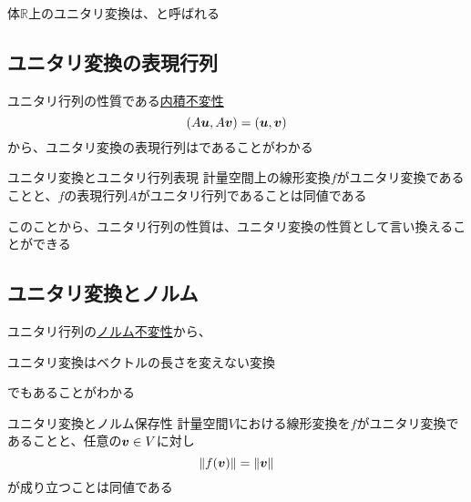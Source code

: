 \documentclass[../../../topic_linear-algebra]{subfiles}
\begin{document}
体$\mathbb{R}$上のユニタリ変換は、と呼ばれる

\subsection{ユニタリ変換の表現行列}

ユニタリ行列の性質である\hyperref[thm:unitary-characterized-by-inner-product-invariance]{内積不変性}
\begin{equation*}
  (A\vb*{u}, A\vb*{v}) = (\vb*{u}, \vb*{v})
\end{equation*}
から、ユニタリ変換の表現行列はであることがわかる

\begin{theorem}{ユニタリ変換とユニタリ行列表現}
  計量空間上の線形変換$f$がユニタリ変換であることと、$f$の表現行列$A$がユニタリ行列であることは同値である
\end{theorem}

このことから、ユニタリ行列の性質は、ユニタリ変換の性質として言い換えることができる

\subsection{ユニタリ変換とノルム}

ユニタリ行列の\hyperref[thm:unitary-characterized-by-norm-invariance]{ノルム不変性}から、
\begin{shaded}
  ユニタリ変換はベクトルの長さを変えない変換
\end{shaded}
でもあることがわかる

\begin{theorem}{ユニタリ変換とノルム保存性}
  計量空間$V$における線形変換を$f$がユニタリ変換であることと、任意の$\vb*{v} \in V$に対し
  \begin{equation*}
    \|f(\vb*{v})\| = \|\vb*{v}\|
  \end{equation*}
  が成り立つことは同値である
\end{theorem}
\end{document}
